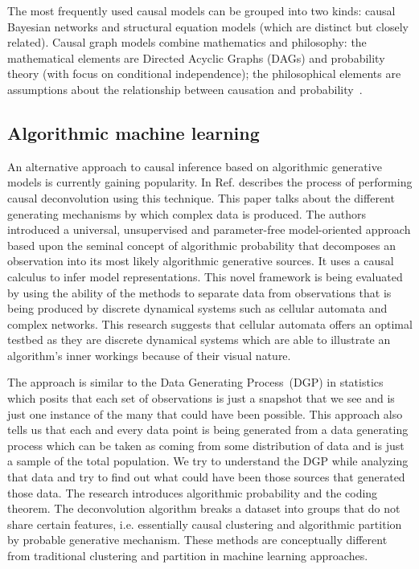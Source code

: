 \documentclass[%
 aps,
 jmp,%
 amsmath,amssymb,
 reprint,%
]{revtex4-2}
\begin{document}
The most frequently used causal models can be grouped into two kinds: causal Bayesian networks and structural equation models (which are distinct but closely related). %
Causal graph models combine mathematics and philosophy: the mathematical elements are Directed Acyclic Graphs (DAGs) and probability theory (with focus on conditional independence); the philosophical elements are assumptions about the relationship between causation and probability~\cite{spirtes2000causation}. %

\subsection{Algorithmic machine learning}

An alternative approach to causal inference based on algorithmic generative models is currently gaining popularity. In 
Ref.\cite{zenil2019causal} describes the process of performing causal deconvolution using this technique.
This paper talks about the different generating mechanisms by which complex data is produced. 
The authors introduced a universal, unsupervised and parameter-free model-oriented approach based upon the seminal concept of algorithmic probability that decomposes an observation into its most likely algorithmic generative sources. 
It uses a causal calculus to infer model representations. 
This novel framework is being evaluated by using the ability of the methods to separate data from observations that is being produced by discrete dynamical systems such as cellular automata and complex networks.
This research suggests that cellular automata offers an optimal testbed as they are discrete dynamical systems which are able to illustrate an algorithm's inner workings because of their visual nature. 

The approach is similar to the Data Generating Process~(DGP) in statistics which posits that each set of observations is just a snapshot that we see and is just one instance of the many that could have been possible. 
This approach also tells us that each and every data point is being generated from a data generating process which can be taken as coming from some distribution of data and is just a sample of the total population. 
We try to understand the DGP while analyzing that data and try to find out what could have been those sources that generated those data.
The research introduces algorithmic probability and the coding theorem. 
The deconvolution algorithm breaks a dataset into groups that do not share certain features, i.e. essentially causal clustering and algorithmic partition by probable generative mechanism.
These methods are conceptually different from traditional clustering and partition in machine learning approaches.
\end{document}
